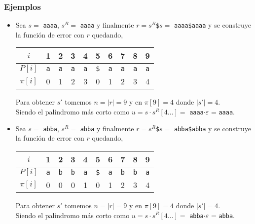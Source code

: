 \subsubsection{Ejemplos}
\begin{itemize}
\item Sea $s = $ \texttt{aaaa}, $s^R =$ \texttt{aaaa} y finalmente
$r = s^R$\texttt{\$}$s =$ \texttt{aaaa\$aaaa} y se construye la función de error con $r$ quedando,

\begin{table}[H]
\centering
\begin{tabular}{c|c|c|c|c|c|c|c|c|c|}
\cline{2-10}
$i$      & 1          & 2          & 3          & 4          & 5           & 6          & 7          & 8          & 9          \\ \hline
$P[i]$   & \texttt{a} & \texttt{a} & \texttt{a} & \texttt{a} & \texttt{\$} & \texttt{a} & \texttt{a} & \texttt{a} & \texttt{a} \\ \hline
$\pi[i]$ & 0          & 1          & 2          & 3          & 0           & 1          & 2          & 3          & 4          \\ \cline{2-10} 
\end{tabular}
\end{table}
Para obtener $s'$ tomemos $n = \vert r \vert = 9$ y en $\pi[9] = 4$ donde $\vert s' \vert = 4$.\\
Siendo el palíndromo más corto como
$u = s \cdot s^R[4 \ldots] =$ \texttt{aaaa}$\cdot \varepsilon$ = \texttt{aaaa}.

\item Sea $s = $ \texttt{abba}, $s^R =$ \texttt{abba} y finalmente
$r = s^R$\texttt{\$}$s =$ \texttt{abba\$abba} y se construye la función de error con $r$ quedando,

\begin{table}[H]
\centering
\begin{tabular}{c|c|c|c|c|c|c|c|c|c|}
\cline{2-10}
$i$      & 1          & 2          & 3          & 4          & 5           & 6          & 7          & 8          & 9          \\ \hline
$P[i]$   & \texttt{a} & \texttt{b} & \texttt{b} & \texttt{a} & \texttt{\$} & \texttt{a} & \texttt{b} & \texttt{b} & \texttt{a} \\ \hline
$\pi[i]$ & 0          & 0          & 0          & 1          & 0           & 1          & 2          & 3          & 4          \\ \cline{2-10} 
\end{tabular}
\end{table}
Para obtener $s'$ tomemos $n = \vert r \vert = 9$ y en $\pi[9] = 4$ donde $\vert s' \vert = 4$.\\
Siendo el palíndromo más corto como
$u = s \cdot s^R[4 \ldots] =$ \texttt{abba}$\cdot \varepsilon$ = \texttt{abba}.


\end{itemize}
